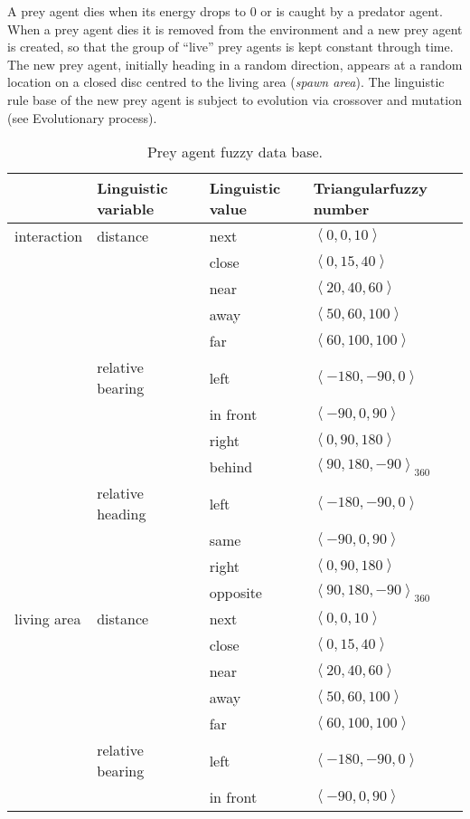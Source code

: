 A prey agent dies when its energy drops to 0 or is caught by a predator agent. When a prey agent dies it is removed from the environment and a new prey agent is created, so that the group of ``live'' prey agents is kept constant through time. The new prey agent, initially heading in a random direction, appears at a random location on a closed disc centred to the living area (\emph{spawn area}). The linguistic rule base of the new prey agent is subject to evolution via crossover and mutation (see Evolutionary process).

\begin{table}
	\caption{Prey agent fuzzy data base.}
	\label{tab:preyDB}
	\begin{tabular}{lllp{2.7cm}}
		\toprule
		& Linguistic variable & Linguistic value & Triangular\newline fuzzy number \\
		\midrule
		interaction & distance & next & $\left<0,0,10\right>$ \\
		& & close & $\left<0,15,40\right>$ \\
		& & near & $\left<20,40,60\right>$ \\
		& & away & $\left<50,60,100\right>$ \\
		& & far & $\left<60,100,100\right>$ \\
		& relative bearing & left & $\left<-180,-90,0\right>$ \\
		& & in front & $\left<-90,0,90\right>$ \\
		& & right & $\left<0,90,180\right>$ \\
		& & behind & $\left<90,180,-90\right>_{360}$ \\
		& relative heading & left & $\left<-180,-90,0\right>$ \\
		& & same & $\left<-90,0,90\right>$ \\
		& & right & $\left<0,90,180\right>$ \\
		& & opposite & $\left<90,180,-90\right>_{360}$ \\
		\hdashline
		living area & distance & next & $\left<0,0,10\right>$ \\
		& & close & $\left<0,15,40\right>$ \\
		& & near & $\left<20,40,60\right>$ \\
		& & away & $\left<50,60,100\right>$ \\
		& & far & $\left<60,100,100\right>$ \\
		& relative bearing & left & $\left<-180,-90,0\right>$ \\
		& & in front & $\left<-90,0,90\right>$ \\

\end{tabular}
\end{table}
